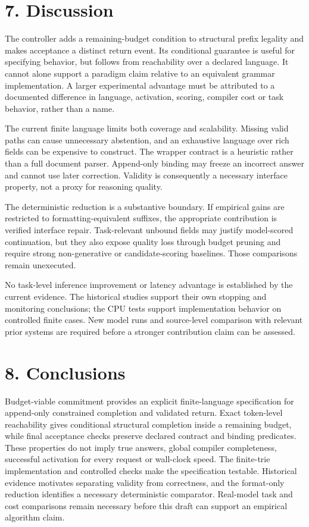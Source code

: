 \documentclass[
  12pt,
  a4paper,
]{article}
\begin{document}
\section{7. Discussion}\label{discussion}

The controller adds a remaining-budget condition to structural prefix
legality and makes acceptance a distinct return event. Its conditional
guarantee is useful for specifying behavior, but follows from
reachability over a declared language. It cannot alone support a
paradigm claim relative to an equivalent grammar implementation. A
larger experimental advantage must be attributed to a documented
difference in language, activation, scoring, compiler cost or task
behavior, rather than a name.

The current finite language limits both coverage and scalability.
Missing valid paths can cause unnecessary abstention, and an exhaustive
language over rich fields can be expensive to construct. The wrapper
contract is a heuristic rather than a full document parser. Append-only
binding may freeze an incorrect answer and cannot use later correction.
Validity is consequently a necessary interface property, not a proxy for
reasoning quality.

The deterministic reduction is a substantive boundary. If empirical
gains are restricted to formatting-equivalent suffixes, the appropriate
contribution is verified interface repair. Task-relevant unbound fields
may justify model-scored continuation, but they also expose quality loss
through budget pruning and require strong non-generative or
candidate-scoring baselines. Those comparisons remain unexecuted.

No task-level inference improvement or latency advantage is established
by the current evidence. The historical studies support their own
stopping and monitoring conclusions; the CPU tests support
implementation behavior on controlled finite cases. New model runs and
source-level comparison with relevant prior systems are required before
a stronger contribution claim can be assessed.

\section{8. Conclusions}\label{conclusions}

Budget-viable commitment provides an explicit finite-language
specification for append-only constrained completion and validated
return. Exact token-level reachability gives conditional structural
completion inside a remaining budget, while final acceptance checks
preserve declared contract and binding predicates. These properties do
not imply true answers, global compiler completeness, successful
activation for every request or wall-clock speed. The finite-trie
implementation and controlled checks make the specification testable.
Historical evidence motivates separating validity from correctness, and
the format-only reduction identifies a necessary deterministic
comparator. Real-model task and cost comparisons remain necessary before
this draft can support an empirical algorithm claim.
\end{document}
